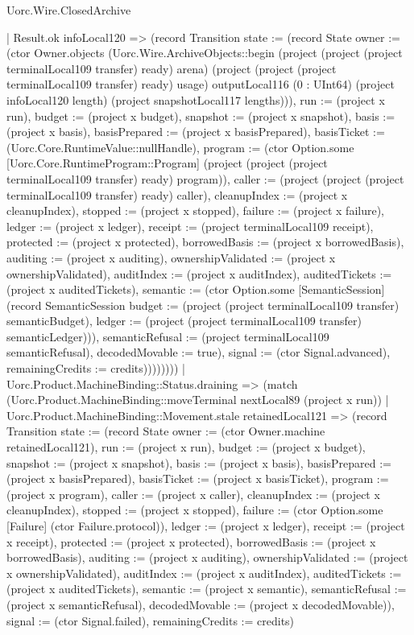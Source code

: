 \begin{lexlean}{Uorc.Wire.ClosedArchive}
\begin{semanticmodule}
{                | Result.ok infoLocal120 => (record Transition {state := (record State {owner := (ctor Owner.objects (Uorc.Wire.ArchiveObjects::begin (project (project (project terminalLocal109 transfer) ready) arena) (project (project (project terminalLocal109 transfer) ready) usage) outputLocal116 (0 : UInt64) (project infoLocal120 length) (project snapshotLocal117 lengths))), run := (project x run), budget := (project x budget), snapshot := (project x snapshot), basis := (project x basis), basisPrepared := (project x basisPrepared), basisTicket := (Uorc.Core.RuntimeValue::nullHandle), program := (ctor Option.some [Uorc.Core.RuntimeProgram::Program] (project (project (project terminalLocal109 transfer) ready) program)), caller := (project (project (project terminalLocal109 transfer) ready) caller), cleanupIndex := (project x cleanupIndex), stopped := (project x stopped), failure := (project x failure), ledger := (project x ledger), receipt := (project terminalLocal109 receipt), protected := (project x protected), borrowedBasis := (project x borrowedBasis), auditing := (project x auditing), ownershipValidated := (project x ownershipValidated), auditIndex := (project x auditIndex), auditedTickets := (project x auditedTickets), semantic := (ctor Option.some [SemanticSession] (record SemanticSession {budget := (project (project terminalLocal109 transfer) semanticBudget), ledger := (project (project terminalLocal109 transfer) semanticLedger)})), semanticRefusal := (project terminalLocal109 semanticRefusal), decodedMovable := true}), signal := (ctor Signal.advanced), remainingCredits := credits}))))))))
    | Uorc.Product.MachineBinding::Status.draining => (match (Uorc.Product.MachineBinding::moveTerminal nextLocal89 (project x run))
      | Uorc.Product.MachineBinding::Movement.stale retainedLocal121 => (record Transition {state := (record State {owner := (ctor Owner.machine retainedLocal121), run := (project x run), budget := (project x budget), snapshot := (project x snapshot), basis := (project x basis), basisPrepared := (project x basisPrepared), basisTicket := (project x basisTicket), program := (project x program), caller := (project x caller), cleanupIndex := (project x cleanupIndex), stopped := (project x stopped), failure := (ctor Option.some [Failure] (ctor Failure.protocol)), ledger := (project x ledger), receipt := (project x receipt), protected := (project x protected), borrowedBasis := (project x borrowedBasis), auditing := (project x auditing), ownershipValidated := (project x ownershipValidated), auditIndex := (project x auditIndex), auditedTickets := (project x auditedTickets), semantic := (project x semantic), semanticRefusal := (project x semanticRefusal), decodedMovable := (project x decodedMovable)}), signal := (ctor Signal.failed), remainingCredits := credits})
}
\end{semanticmodule}
\end{lexlean}
